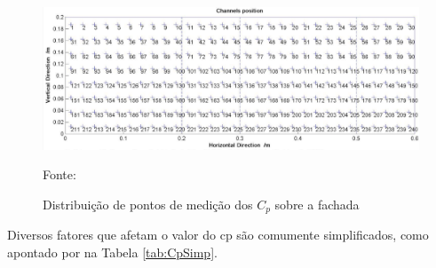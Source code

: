 \documentclass[brazil,hardcopy,openany]{ufscthesis} %
\newcommand{\source}[1]{\small \caption*{Fonte: {#1}} } %
\begin{document}
\begin{figure}[h]
	\centering
	\caption{Distribuição de pontos de medição dos $C_p$ sobre a fachada}
	\includegraphics[width=1\linewidth]{img/tpu_points.png}
	\label{fig:TPU_points}
	\source{}
\end{figure}

Diversos fatores que afetam o valor do \acrshort{cp} são comumente simplificados, como apontado por  na Tabela \ref{tab:CpSimp}.
\end{document}
